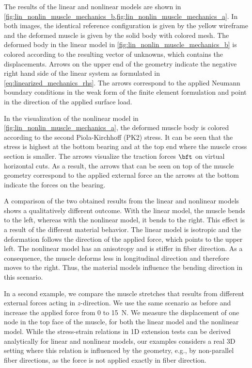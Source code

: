 The results of the linear and nonlinear models are shown in \cref{fig:lin_nonlin_muscle_mechanics_b,fig:lin_nonlin_muscle_mechanics_a}. 
In both images, the identical reference configuration is given by the yellow wireframe and the deformed muscle is given by the solid body with colored mesh. 
The deformed body in the linear model in \cref{fig:lin_nonlin_muscle_mechanics_b} is colored according to the resulting vector of unknowns, which contains the displacements.  Arrows on the upper end of the geometry indicate the negative right hand side of the linear system as formulated in \cref{eq:linearized_mechanics_rhs}. The arrows correspond to the applied Neumann boundary conditions in the weak form of the finite element formulation and point in the direction of the applied surface load.

In the visualization of the nonlinear model in \cref{fig:lin_nonlin_muscle_mechanics_a}, the deformed muscle body is colored according to the second Piola-Kirchhoff (PK2) stress. It can be seen that the stress is highest at the bottom bearing and at the top end where the muscle cross section is smaller. The arrows visualize the traction forces $\bft$ on virtual horizontal cuts. As a result, the arrows that can be seen on top of the muscle geometry correspond to the applied external force an the arrows at the bottom indicate the forces on the bearing.

A comparison of the two obtained results from the linear and nonlinear models shows a qualitatively different outcome. With the linear model, the muscle bends to the left, whereas with the nonlinear model, it bends to the right. This effect is a result of the different material behavior. The linear model is isotropic and the deformation follows the direction of the applied force, which points to the upper left. The nonlinear model has an anisotropy and is stiffer in fiber direction. As a consequence, the muscle deforms less in longitudinal direction and therefore moves to the right.
Thus, the material models influence the bending direction in this scenario.

In a second example, we compare the muscle stretches that results from different external forces acting in $z$-direction.  We use the same scenario as before and increase the applied force from 0 to \SI{15}{\newton}. We measure the displacement of one node in the top face of the muscle, for both the linear model and the nonlinear model. While the stress-strain relations  in 1D extension tests  can be derived analytically for linear and nonlinear models, our examples considers a real 3D setting where this relation is influenced by the geometry, e.g., by non-parallel fiber directions, as the force is not applied exactly in fiber direction.

